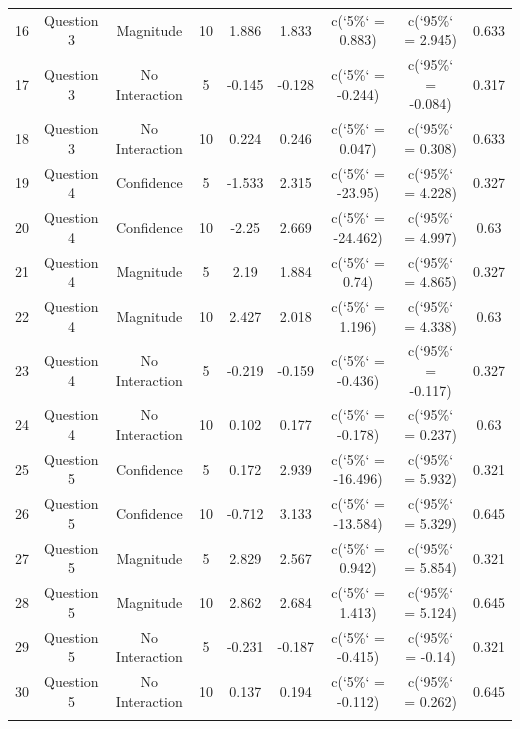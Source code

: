 \begin{table}[!htbp]
\begin{tabular}{@{\extracolsep{5pt}} ccccccccc}
16 & Question 3 & Magnitude & 10 & 1.886 & 1.833 & c(`5\%` = 0.883) & c(`95\%` = 2.945) & 0.633 \\ 
17 & Question 3 & No Interaction & 5 & -0.145 & -0.128 & c(`5\%` = -0.244) & c(`95\%` = -0.084) & 0.317 \\ 
18 & Question 3 & No Interaction & 10 & 0.224 & 0.246 & c(`5\%` = 0.047) & c(`95\%` = 0.308) & 0.633 \\ 
19 & Question 4 & Confidence & 5 & -1.533 & 2.315 & c(`5\%` = -23.95) & c(`95\%` = 4.228) & 0.327 \\ 
20 & Question 4 & Confidence & 10 & -2.25 & 2.669 & c(`5\%` = -24.462) & c(`95\%` = 4.997) & 0.63 \\ 
21 & Question 4 & Magnitude & 5 & 2.19 & 1.884 & c(`5\%` = 0.74) & c(`95\%` = 4.865) & 0.327 \\ 
22 & Question 4 & Magnitude & 10 & 2.427 & 2.018 & c(`5\%` = 1.196) & c(`95\%` = 4.338) & 0.63 \\ 
23 & Question 4 & No Interaction & 5 & -0.219 & -0.159 & c(`5\%` = -0.436) & c(`95\%` = -0.117) & 0.327 \\ 
24 & Question 4 & No Interaction & 10 & 0.102 & 0.177 & c(`5\%` = -0.178) & c(`95\%` = 0.237) & 0.63 \\ 
25 & Question 5 & Confidence & 5 & 0.172 & 2.939 & c(`5\%` = -16.496) & c(`95\%` = 5.932) & 0.321 \\ 
26 & Question 5 & Confidence & 10 & -0.712 & 3.133 & c(`5\%` = -13.584) & c(`95\%` = 5.329) & 0.645 \\ 
27 & Question 5 & Magnitude & 5 & 2.829 & 2.567 & c(`5\%` = 0.942) & c(`95\%` = 5.854) & 0.321 \\ 
28 & Question 5 & Magnitude & 10 & 2.862 & 2.684 & c(`5\%` = 1.413) & c(`95\%` = 5.124) & 0.645 \\ 
29 & Question 5 & No Interaction & 5 & -0.231 & -0.187 & c(`5\%` = -0.415) & c(`95\%` = -0.14) & 0.321 \\ 
30 & Question 5 & No Interaction & 10 & 0.137 & 0.194 & c(`5\%` = -0.112) & c(`95\%` = 0.262) & 0.645 \\ 
\hline \\[-1.8ex] 
\end{tabular} 
\end{table} 
